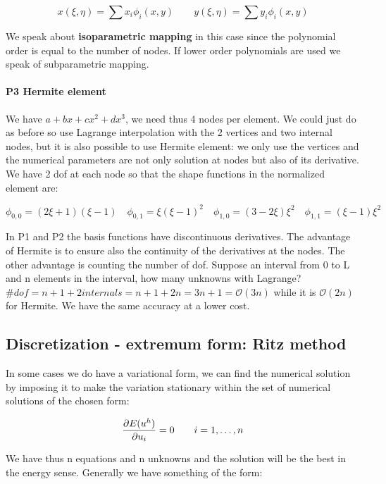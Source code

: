 \begin{equation}
x(\xi , \eta) = \sum x_i\phi _i (x, y) \qquad y(\xi , \eta) = \sum y_i\phi _i (x, y)
\end{equation}

We speak about \textbf{isoparametric mapping} in this case since the polynomial order is equal to the number of nodes. If lower order polynomials are used we speak of subparametric mapping. 

\paragraph{P3 Hermite element}
We have $a + bx + cx^2 + dx^3$, we need thus 4 nodes per element. We could just do as before so use Lagrange interpolation with the 2 vertices and two internal nodes, but it is also possible to use Hermite element: we only use the vertices and the numerical parameters are not only solution at nodes but also of its derivative. We have 2 dof at each node so that the shape functions in the normalized element are: 

\begin{equation}
\phi_{0,0} = (2\xi  + 1)(\xi -1)\quad \phi_{0,1} = \xi (\xi -1)^2\quad \phi_{1,0} = (3-2\xi )\xi^2\quad \phi_{1,1} = (\xi - 1)\xi ^2
\end{equation}

In P1 and P2 the basis functions have discontinuous derivatives. The advantage of Hermite is to ensure also the continuity of the derivatives at the nodes. The other advantage is counting the number of dof. Suppose an interval from 0 to L and n elements in the interval, how many unknowns with Lagrange? $\#dof = n+1 + 2 internals = n+1+ 2n = 3n +1 = \mathcal{O}(3n)$ while it is $\mathcal{O}(2n)$ for Hermite. We have the same accuracy at a lower cost. 

\subsection{Discretization - extremum form: Ritz method}
In some cases we do have a variational form, we can find the numerical solution by imposing it to make the variation stationary within the set of numerical solutions of the chosen form: 

\begin{equation}
\frac{\partial E (u^h)}{\partial u_i} = 0 \qquad i = 1, \dots , n
\end{equation}

We have thus n equations and n unknowns and the solution will be the best in the energy sense. Generally we have something of the form: 

